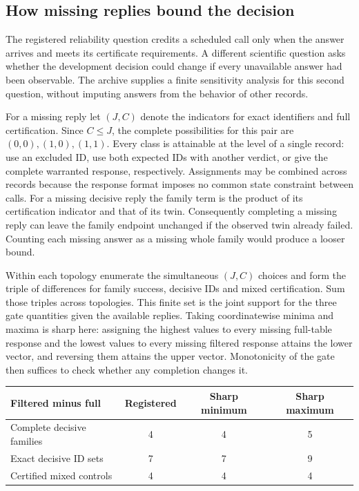 \documentclass[12pt,letterpaper]{article}
\begin{document}
\subsection{How missing replies bound the decision}

The registered reliability question credits a scheduled call only when the answer arrives and meets its certificate requirements. A different scientific question asks whether the development decision could change if every unavailable answer had been observable. The archive supplies a finite sensitivity analysis for this second question, without imputing answers from the behavior of other records.

For a missing reply let $(J,C)$ denote the indicators for exact identifiers and full certification. Since $C\leq J$, the complete possibilities for this pair are $(0,0),(1,0),(1,1)$. Every class is attainable at the level of a single record: use an excluded ID, use both expected IDs with another verdict, or give the complete warranted response, respectively. Assignments may be combined across records because the response format imposes no common state constraint between calls. For a missing decisive reply the family term is the product of its certification indicator and that of its twin. Consequently completing a missing reply can leave the family endpoint unchanged if the observed twin already failed. Counting each missing answer as a missing whole family would produce a looser bound.

Within each topology enumerate the simultaneous $(J,C)$ choices and form the triple of differences for family success, decisive IDs and mixed certification. Sum those triples across topologies. This finite set is the joint support for the three gate quantities given the available replies. Taking coordinatewise minima and maxima is sharp here: assigning the highest values to every missing full-table response and the lowest values to every missing filtered response attains the lower vector, and reversing them attains the upper vector. Monotonicity of the gate then suffices to check whether any completion changes it.

\begin{center}{\small\setlength{\tabcolsep}{4pt}\begin{tabularx}{\linewidth}{@{}Yccc@{}}\toprule
Filtered minus full & Registered & Sharp minimum & Sharp maximum\\ \midrule
Complete decisive families & 4 & 4 & 5\\
Exact decisive ID sets & 7 & 7 & 9\\
Certified mixed controls & 4 & 4 & 4\\ \bottomrule\end{tabularx}}
\end{center}
\end{document}
